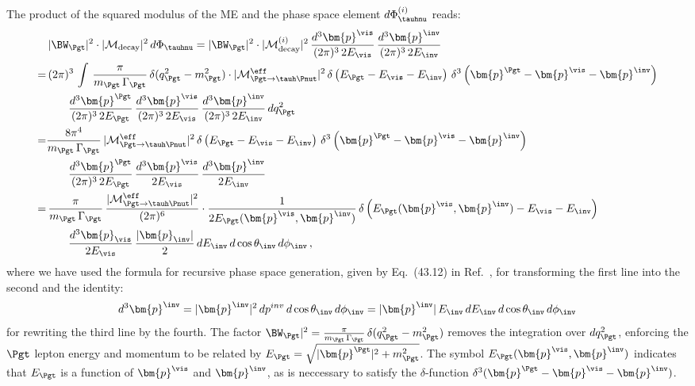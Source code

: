 The product of the squared modulus of the ME and the phase space
element $d\Phi^{(i)}_{\tauhnu}$ reads:
\begin{align}
 & \, \vert \BW_{\Pgt} \vert^{2} \cdot \vert\mathcal{M}_{\textrm{decay}}\vert^{2} \,
 d\Phi_{\tauhnu} = \vert \BW_{\Pgt} \vert^{2} \cdot \vert \mathcal{M}^{(i)}_{\textrm{decay}}
\vert^{2} \, \frac{d^{3}\bm{p}^{\vis}}{(2\pi)^{3} \, 2
   E_{\vis}} \, \frac{d^{3}\bm{p}^{\inv}}{(2\pi)^{3} \, 2 E_{\inv}} \nonumber \\
= & \, (2\pi)^{3} \, \int \, \frac{\pi}{m_{\Pgt} \, \Gamma_{\Pgt}} \,
\delta ( q_{\Pgt}^{2} - m_{\Pgt}^{2} ) \cdot \vert\mathcal{M}^{\eff}_{\Pgt \to
  \tauh\Pnut}\vert^{2} \, \delta \left( E_{\Pgt} - E_{\vis} -
  E_{\inv} \right) \, \delta^{3} \left( \bm{p}^{\Pgt} - \bm{p}^{\vis}
  - \bm{p}^{\inv} \right) \nonumber \\
& \qquad \frac{d^{3}\bm{p}^{\Pgt}}{(2\pi)^{3} \, 2 E_{\Pgt}} \, 
  \frac{d^{3}\bm{p}^{\vis}}{(2\pi)^{3} \, 2E_{\vis}} \, \frac{d^{3}\bm{p}^{\inv}}{(2\pi)^{3} \, 2 E_{\inv}} \, dq^{2}_{\Pgt} \nonumber \\
= & \frac{8\pi^{4}}{m_{\Pgt} \, \Gamma_{\Pgt}} \, \vert\mathcal{M}^{\eff}_{\Pgt \to
  \tauh\Pnut}\vert^{2} \, \delta \left( E_{\Pgt} - E_{\vis} -
  E_{\inv} \right) \, \delta^{3} \left( \bm{p}^{\Pgt} - \bm{p}^{\vis}
  - \bm{p}^{\inv} \right) \nonumber \\
& \qquad \frac{d^{3}\bm{p}^{\Pgt}}{(2\pi)^{3} \, 2 E_{\Pgt}} \, 
  \frac{d^{3}\bm{p}^{\vis}}{2 E_{\vis}} \, \frac{d^{3}\bm{p}^{\inv}}{2
    E_{\inv}} \nonumber \\
= & \, \frac{\pi}{m_{\Pgt} \, \Gamma_{\Pgt}} \, \frac{\vert\mathcal{M}^{\eff}_{\Pgt \to
  \tauh\Pnut}\vert^{2}}{(2\pi)^{6}} 
 \cdot \frac{1}{2 E_{\Pgt}(\bm{p}^{\vis}, \bm{p}^{\inv})} \, \delta
 \left( E_{\Pgt}(\bm{p}^{\vis}, \bm{p}^{\inv}) - E_{\vis} - E_{\inv}
 \right) \nonumber \\
& \qquad
  \frac{d^{3}\bm{p}_{\vis}}{2 E_{\vis}} \, \frac{\vert\bm{p}_{\inv}\vert}{2} \, dE_{\inv} \, d\cos\theta_{\inv} \, d\phi_{\inv} \, ,
\label{eq:hadTauDecaysPSint}
\end{align}
where we have used the formula for recursive phase space generation,
given by Eq.~(43.12) in Ref.~\cite{PDG}, for transforming the first line into the second
and the identity:
\begin{equation} 
d^{3}\bm{p}^{\inv} = \vert\bm{p}^{\inv}\vert^{2} \,
dp^{inv} \, d\cos\theta_{\inv} \, d\phi_{\inv} =
\vert\bm{p}^{\inv}\vert \, E_{\inv} \, dE_{\inv} \, d\cos\theta_{\inv}
\, d\phi_{\inv}
\end{equation} 
for rewriting the third line by the fourth.
The factor $\BW_{\Pgt} \vert^{2} = \frac{\pi}{m_{\Pgt} \,
  \Gamma_{\Pgt}} \, \delta ( q^{2}_{\Pgt} - m^{2}_{\Pgt} )$ removes
the integration over $dq^{2}_{\Pgt}$, enforcing the $\Pgt$ lepton
energy and momentum to be related by $E_{\Pgt} =
\sqrt{\vert\bm{p}^{\Pgt}\vert^{2} + m_{\Pgt}^{2}}$.
The symbol $E_{\Pgt}(\bm{p}^{\vis}, \bm{p}^{\inv})$
indicates that $E_{\Pgt}$ is a function of $\bm{p}^{\vis}$
and $\bm{p}^{\inv}$, as is neccessary to satisfy the $
\delta$-function $\delta^{3} ( \bm{p}^{\Pgt} - \bm{p}^{\vis} - \bm{p}^{\inv} )$.

